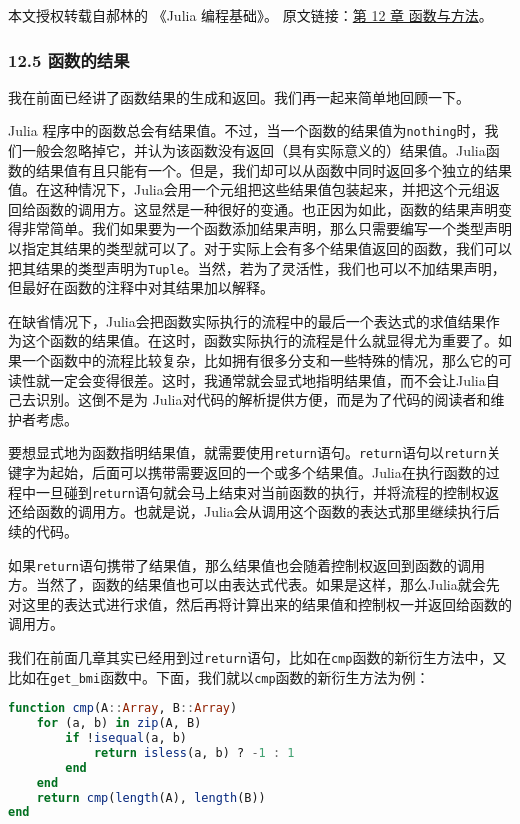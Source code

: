 
本文授权转载自郝林的 《Julia 编程基础》。 原文链接：\href{https://github.com/hyper0x/JuliaBasics/blob/master/book/ch12.md}{第 12 章 函数与方法}。


\subsubsection{12.5 函数的结果}

我在前面已经讲了函数结果的生成和返回。我们再一起来简单地回顾一下。

Julia 程序中的函数总会有结果值。不过，当一个函数的结果值为\verb|nothing|时，我们一般会忽略掉它，并认为该函数没有返回（具有实际意义的）结果值。Julia函数的结果值有且只能有一个。但是，我们却可以从函数中同时返回多个独立的结果值。在这种情况下，Julia会用一个元组把这些结果值包装起来，并把这个元组返回给函数的调用方。这显然是一种很好的变通。也正因为如此，函数的结果声明变得非常简单。我们如果要为一个函数添加结果声明，那么只需要编写一个类型声明以指定其结果的类型就可以了。对于实际上会有多个结果值返回的函数，我们可以把其结果的类型声明为\verb|Tuple|。当然，若为了灵活性，我们也可以不加结果声明，但最好在函数的注释中对其结果加以解释。

在缺省情况下，Julia会把函数实际执行的流程中的最后一个表达式的求值结果作为这个函数的结果值。在这时，函数实际执行的流程是什么就显得尤为重要了。如果一个函数中的流程比较复杂，比如拥有很多分支和一些特殊的情况，那么它的可读性就一定会变得很差。这时，我通常就会显式地指明结果值，而不会让Julia自己去识别。这倒不是为 Julia对代码的解析提供方便，而是为了代码的阅读者和维护者考虑。

要想显式地为函数指明结果值，就需要使用\verb|return|语句。\verb|return|语句以\verb|return|关键字为起始，后面可以携带需要返回的一个或多个结果值。Julia在执行函数的过程中一旦碰到\verb|return|语句就会马上结束对当前函数的执行，并将流程的控制权返还给函数的调用方。也就是说，Julia会从调用这个函数的表达式那里继续执行后续的代码。

如果\verb|return|语句携带了结果值，那么结果值也会随着控制权返回到函数的调用方。当然了，函数的结果值也可以由表达式代表。如果是这样，那么Julia就会先对这里的表达式进行求值，然后再将计算出来的结果值和控制权一并返回给函数的调用方。

我们在前面几章其实已经用到过\verb|return|语句，比如在\verb|cmp|函数的新衍生方法中，又比如在\verb|get_bmi|函数中。下面，我们就以\verb|cmp|函数的新衍生方法为例：

\begin{lstlisting}[language=julia]
function cmp(A::Array, B::Array)
    for (a, b) in zip(A, B)
        if !isequal(a, b)
            return isless(a, b) ? -1 : 1
        end
    end
    return cmp(length(A), length(B))
end
\end{lstlisting}

